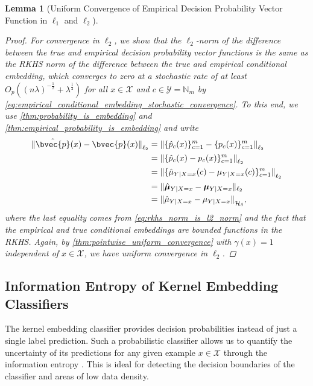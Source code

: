 \documentclass{article}
\newtheorem{lemma}[theorem]{Lemma}
\begin{document}
\begin{lemma}[Uniform Convergence of Empirical Decision Probability Vector Function in $\ell_{1}$ and $\ell_{2}$]
\begin{proof}
			For convergence in $\ell_{2}$, we show that the $\ell_{2}$-norm of the difference between the true and empirical decision probability vector functions is the same as the RKHS norm of the difference between the true and empirical conditional embedding, which converges to zero at a stochastic rate of at least $O_{p}((n \lambda)^{-\frac{1}{2}} + \lambda^{\frac{1}{2}})$ for all $x \in \mathcal{X}$ and $c \in \mathcal{Y} = \mathbb{N}_{m}$ by \eqref{eq:empirical_conditional_embedding_stochastic_convergence}. To this end, we use \cref{thm:probability_is_embedding} and \cref{thm:empirical_probability_is_embedding} and write 
			\begin{equation}
				\begin{aligned}
					{\lVert \hat{\bvec{p}}(x)  - \bvec{p}(x) \rVert}_{\ell_{2}} &= {\lVert \{ \hat{p}_{c}(x) \}_{c = 1}^{m} - \{ p_{c}(x) \}_{c = 1}^{m} \rVert}_{\ell_{2}} \\
					&= {\lVert \{ \hat{p}_{c}(x) - p_{c}(x) \}_{c = 1}^{m} \rVert}_{\ell_{2}} \\
					&= {\lVert \{ \hat{\mu}_{Y | X = x}(c) - \mu_{Y | X = x}(c)\}_{c = 1}^{m} \rVert}_{\ell_{2}} \\
					&= \| \hat{\bm{\mu}}_{Y | X = x} - \bm{\mu}_{Y | X = x}  \|_{\ell_{2}} \\
					&= {\lVert \hat{\mu}_{Y | X = x} - \mu_{Y | X = x}\rVert}_{\mathcal{H}_{\delta}},
				\end{aligned}
			\end{equation}
			where the last equality comes from \eqref{eq:rkhs_norm_is_l2_norm} and the fact that the empirical and true conditional embeddings are bounded functions in the RKHS. Again, by \cref{thm:pointwise_uniform_convergence} with $\gamma(x) = 1$ independent of $x \in \mathcal{X}$, we have uniform convergence in $\ell_{2}$.
		\end{proof}
	\end{lemma}
		
	\subsection{Information Entropy of Kernel Embedding Classifiers}
	\label{app:information_entropy}
	
		The kernel embedding classifier provides decision probabilities instead of just a single label prediction. Such a probabilistic classifier allows us to quantify the uncertainty of its predictions for any given example $x \in \mathcal{X}$ through the information entropy \citep{shannon1951prediction, jaynes1957information}. This is ideal for detecting the decision boundaries of the classifier and areas of low data density.
		
\end{document}
